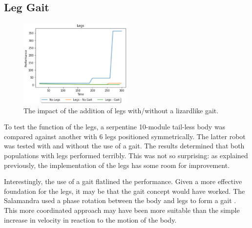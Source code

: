 \documentclass{article}
\begin{document}
\subsection{Leg Gait}
\label{sec:Leg Res}
\begin{figure}
    \centering
    \vspace*{-5mm}
    \includegraphics[width=0.5\textwidth]{legResults}
    \vspace*{-7mm}
    \caption{The impact of the addition of legs with/without a lizardlike gait.}
\end{figure}
To test the function of the legs, a serpentine 10-module tail-less body was compared against another with 6 legs positioned symmetrically. The latter robot was tested with and without the use of a gait. The results determined that both populations with legs performed terribly. This was not so surprising: as explained previously, the implementation of the legs has some room for improvement.

Interestingly, the use of a gait flatlined the performance. Given a more effective foundation for the legs, it may be that the gait concept would have worked. The Salamandra used a phase rotation between the body and legs to form a gait . This more coordinated approach may have been more suitable than the simple increase in velocity in reaction to the motion of the body. \\
\end{document}
